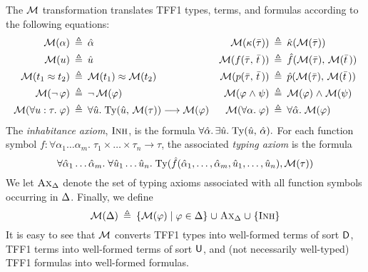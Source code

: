 The $\mathcal{M}$ transformation translates TFF1 types, terms, and formulas
according to the following equations:
\begin{align*}
\mathcal{M}(\alpha) &\:\triangleq\: \hat{\alpha} &
\mathcal{M}(\kappa(\bar{\tau})) &\:\triangleq\: \hat{\kappa}(\mathcal{M}(\bar{\tau})) \\
\mathcal{M}(u) &\:\triangleq\: \hat{u} &
\mathcal{M}(f(\bar{\tau},\,\bar{t}\,)) &\:\triangleq\: \hat{f}(\mathcal{M}(\bar{\tau}),\,\mathcal{M}(\bar{t}\,)) \\
\mathcal{M}(t_1 \approx t_2) &\:\triangleq\: \mathcal{M}(t_1) \approx \mathcal{M}(t_2) &
\mathcal{M}(p(\bar{\tau},\,\bar{t}\,)) &\:\triangleq\: \hat{p}(\mathcal{M}(\bar{\tau}),\,\mathcal{M}(\bar{t}\,)) \\
\mathcal{M}(\lnot\, \varphi) &\:\triangleq\: \lnot\, \mathcal{M}(\varphi) &
\mathcal{M}(\varphi \mathrel{\land} \psi) &\:\triangleq\: \mathcal{M}(\varphi) \mathrel{\land} \mathcal{M}(\psi) \\
\mathcal{M}(\forall u \mathrel{:} \tau .\; \varphi) &\:\triangleq\:
\forall \hat{u} .\; \mathrm{Ty}(\hat{u},\, \mathcal{M}(\tau)) \longrightarrow \mathcal{M}(\varphi) &
\mathcal{M}(\forall \alpha .\; \varphi) &\:\triangleq\:
\forall \hat{\alpha} .\; \mathcal{M}(\varphi)
\end{align*}
%
\newcommand{\AxD}{\text{\sc Ax}_{\DEL}}%
\newcommand{\Inh}{\text{\sc Inh}}%
\newcommand{\Dom}{\mathrm{Dom}}%
%
The {\em inhabitance axiom}, $\Inh$, is the formula
$\forall \hat{\alpha}.\, \exists \hat{u} .\;
\mathrm{Ty}(\hat{u},\,\hat{\alpha}).$
For each function symbol $f :
\forall \alpha_1\dots\alpha_m .\; \tau_1 \times \dots \times \tau_n \to \tau$,
the associated {\em typing axiom\/} is the formula
$$
\forall \hat{\alpha}_1\dots\hat{\alpha}_m .\;
\forall \hat{u}_1\dots\hat{u}_n .\;
\typeof(\hat{f}(\hat{\alpha}_1,\dots,\hat{\alpha}_m,
\hat{u}_1,\dots,\hat{u}_n), \MON(\tau))%
$$
We let $\AxD$ denote the set of typing axioms associated with all function
symbols occurring in $\mathrm{\Delta}$.
%
Finally, we define
$$
\MON(\DEL) \eqdef \{ \MON(\varphi) \vb \varphi \in \DEL \} \mathrel\cup
\AxD \mathrel\cup \{ \Inh \}%
$$
%
It is easy to see that $\mathcal{M}$ converts TFF1 types into well-formed
terms of sort $\mathsf{D}$, TFF1 terms into well-formed terms of sort $\mathsf{U}$,
and (not necessarily well-typed) TFF1 formulas into well-formed formulas.

